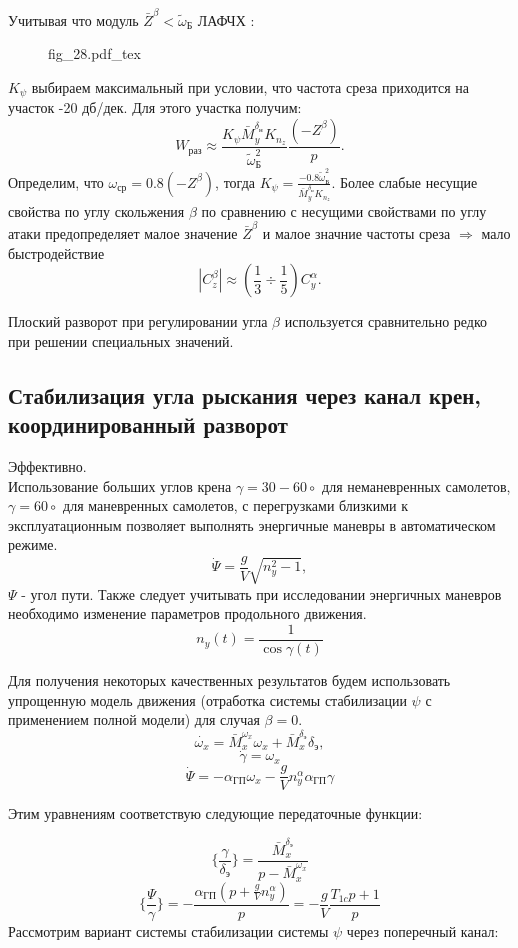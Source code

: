 \documentclass{article}
\begin{document}
Учитывая что модуль $\bar{Z}^\beta < \tilde{\omega}_Б$
ЛАФЧХ :
\begin{figure}[H]
\centering
{fig_28.pdf_tex}
\end{figure}

$K_{\psi}$ выбираем максимальный при условии, что частота среза приходится на участок -20 дб/дек. Для этого участка получим:
\[
W_{раз} \approx \frac{K_{\psi}\bar{M}_y^{\delta_н} K_{n_z}}{\tilde{\omega}_Б^2}\frac{(-Z^\beta)}{p}.
\]
Определим, что $\omega_{ср} = 0.8(-Z^\beta)$, тогда $K_{\psi}=\frac{-0.8 \tilde{\omega}_Б^2}{\bar{M}_y^{\delta_н} K_{n_z}}$.
Более слабые несущие свойства по углу скольжения $\beta$ по сравнению с несущими свойствами по углу атаки предопределяет малое значение $\bar{Z}^\beta$ и малое значние частоты среза $\Rightarrow$ мало быстродействие
\[
|C_z^\beta| \approx (\frac{1}{3} \div\frac{1}{5}) C_y^\alpha.
\]

Плоский разворот при регулировании угла $\beta$ используется сравнительно редко при решении специальных значений.

\subsection{Стабилизация угла рыскания через канал крен, координированный разворот}
Эффективно.\\
Использование больших углов крена $\gamma = 30 - 60 \circ$ для неманевренных самолетов, $\gamma = 60 \circ$ для маневренных самолетов, с перегрузками близкими к эксплуатационным позволяет выполнять энергичные маневры в автоматическом режиме.
\[
\dot{\Psi} =\frac{g}{V} \sqrt{n_y^2 -1},
\]
$\Psi$ - угол пути. Также следует учитывать при исследовании энергичных маневров необходимо изменение параметров продольного движения.
\[
n_y(t) =\frac{1}{\cos{\gamma(t)}} 
\]

Для получения некоторых качественных результатов будем использовать упрощенную модель движения (отработка системы стабилизации $\psi$ с применением полной модели) для случая $\beta = 0$.
\[
\dot{\omega_x} =\bar{M}_x^{\omega_x} \omega_x +\bar{M}_{x}^{\delta_э} \delta_э,
\]
\[
\dot{\gamma} = \omega_x
\]
\[
\dot{\Psi} = - \alpha_{ГП}\omega_x - \frac{g}{V} n_y^\alpha \alpha_{ГП}\gamma
\]

Этим уравнениям соответствую следующие передаточные функции:

\[
\{\frac{\gamma}{\delta_э} \} =\frac{\bar{M}_{x}^{\delta_э}}{p -\bar{M}_x^{\omega_x}}
\]
\[
\{\frac{\Psi}{\gamma}\} = - \frac{\alpha_{ГП} (p + \frac{g}{V}n_y^\alpha)}{p} = -\frac{g}{V} \frac{T_{1c}p + 1}{p}
\]
Рассмотрим вариант системы стабилизации системы $\psi$ через поперечный канал:
\end{document}
